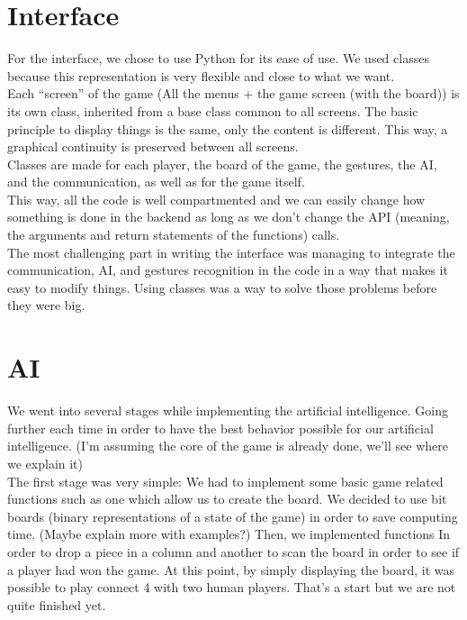 \documentclass[12pt, a4paper, oneside]{report}
\begin{document}
	\section{Interface}
	For the interface, we chose to use Python for its ease of use. We used classes because this representation is very flexible and close to what we want. \\

	Each “screen” of the game (All the menus + the game screen (with the board)) is its own class, inherited from a base class common to all screens. The basic principle to display things is the same, only the content is different. This way, a graphical continuity is preserved between all screens. \\

	Classes are made for each player, the board of the game, the gestures, the AI, and the communication, as well as for the game itself. \\
	This way, all the code is well compartmented and we can easily change how something is done in the backend as long as we don't change the API (meaning, the arguments and return statements of the functions) calls. \\

	The most challenging part in writing the interface was managing to integrate the communication, AI, and gestures recognition in the code in a way that makes it easy to modify things. Using classes was a way to solve those problems before they were big.

	\section{AI}\label{AI_section}

	We went into several stages while implementing the artificial intelligence. Going further each time in order to have the best behavior possible for our artificial intelligence. (I’m assuming the core of the game is already done, we’ll see where we explain it)\\

The first stage was very simple:
 	We had to implement some basic game related functions such as one which allow us to create the board. We decided to use bit boards (binary representations of a state of the game) in order to save computing time. (Maybe explain more with examples?)
	Then, we implemented functions In order to drop a piece in a column and another to scan the board in order to see if a player had won the game. At this point, by simply displaying the board, it was possible to play connect 4 with two human players. That’s a start but we are not quite finished yet. \\
\end{document}
